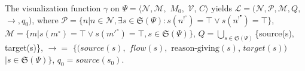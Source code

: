 \begin{definition}
The visualization function $\gamma$ on $\Psi=\langle $$\mathcal{N}, $$\mathcal{M},$ $M_{0},$ $\mathcal{V}$, $C$$\rangle$ %
yields $\mathcal{L}$$=$$($$\mathcal{N},$$\mathcal{P}, \mathcal{M},$$Q,$$\rightarrow,$$q_0)$, where %
$\mathcal{P}=\{n|n\in \mathcal{N},\exists s\in \mathfrak{S}(\Psi):s(n^{!^\circ})=\top \vee s(n^{!^\bullet})=\top\}$, 
$\mathcal{M}=\{m|s(m^\circ)=\top \vee s(m'^\circ)=\top, s\in \mathfrak{S}(\Psi)\}$,
$Q=\bigcup_{s\in \mathfrak{S}(\Psi)}$\{source(s), target(s)\}, $\rightarrow=$ $\{(source(s),$ $flow(s), $ $\text{reason-giving}(s)$, $target(s))$ $|s\in \mathfrak{S}(\Psi)\}$, $q_0$$=source(s_0)$.
%
%
$$
\end{definition}
